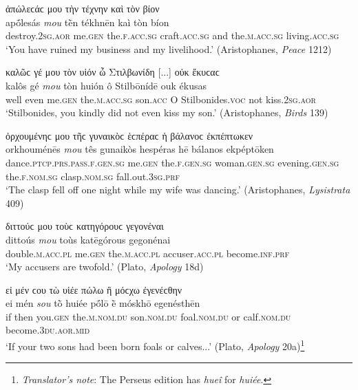 \begin{exe}
\ex ἀπώλεϲάϲ μου τὴν τέχνην καὶ τὸν βίον\\
\gll apṓlesás \emph{mou} tḕn tékhnēn kaì tòn bíon\\
destroy.\textsc{2sg.aor} me.\textsc{gen} the.\textsc{f.acc.sg} craft.\textsc{acc.sg} and the.\textsc{m.acc.sg} living.\textsc{acc.sg}\\
\trans `You have ruined my business and my livelihood.' (Aristophanes, \textit{Peace} 1212)
\label{gen11}
\end{exe}

\begin{exe}
\ex καλῶϲ γέ μου τὸν υἱόν ὦ Στιλβωνίδη {[}...{]} οὐκ ἔκυϲαϲ\\
\gll kalôs gé \emph{mou} tòn huión ô Stilbōnídē ouk ékusas\\
well even me.\textsc{gen} the.\textsc{m.acc.sg} son.\textsc{acc} O Stilbonides.\textsc{voc} not kiss.\textsc{2sg.aor}\\
\trans `Stilbonides, you kindly did not even kiss my son.' (Aristophanes, \textit{Birds} 139)
\label{gen12}
\end{exe}

\begin{exe}
\ex ὀρχουμένηϲ μου τῆϲ γυναικὸϲ ἑϲπέραϲ ἡ βάλανοϲ ἐκπέπτωκεν\\
\gll orkhouménēs \emph{mou} tês gunaikòs hespéras hē bálanos ekpéptōken\\
dance.\textsc{ptcp.prs.pass.f.gen.sg} me.\textsc{gen} the.\textsc{f.gen.sg} woman.\textsc{gen.sg} evening.\textsc{gen.sg} the.\textsc{f.nom.sg} clasp.\textsc{nom.sg} fall.out.\textsc{3sg.prf}\\
\trans `The clasp fell off one night while my wife was dancing.' (Aristophanes, \textit{Lysistrata} 409)
\label{gen13}
\end{exe}

\begin{exe}
\ex διττούϲ μου τοὺϲ κατηγόρουϲ γεγονέναι\\
\gll dittoús \emph{mou} toùs katēgórous gegonénai\\
double.\textsc{m.acc.pl} me.\textsc{gen} the.\textsc{m.acc.pl} accuser.\textsc{acc.pl} become.\textsc{inf.prf}\\
\trans `My accusers are twofold.' (Plato, \textit{Apology} 18d)
\label{gen14}
\end{exe}

\begin{exe}
\ex εἰ μέν ϲου τὼ υἱέε πώλω ἢ μόϲχω ἐγενέϲθην\\
\gll ei mén \emph{sou} tṑ huiée pṓlō ḕ móskhō egenésthēn\\
if then you.\textsc{gen} the.\textsc{m.nom.du} son.\textsc{nom.du} foal.\textsc{nom.du} or calf.\textsc{nom.du} become.\textsc{3du.aor.mid}\\
\trans `If your two sons had been born foals or calves...' (Plato, \textit{Apology} 20a)\footnote{\emph{Translator's note}: The Perseus edition has \textit{hueî} for \textit{huiée}.}
\label{gen15}
\end{exe}

